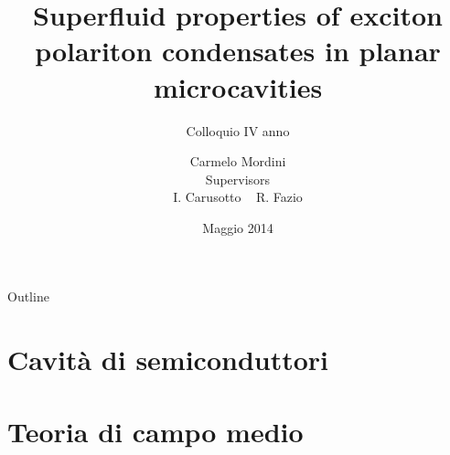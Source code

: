 \documentclass[10pt]{beamer}
\title{Superfluid properties of exciton polariton condensates in planar microcavities}
\subtitle{Colloquio IV anno}
\author[Carmelo Mordini]{Carmelo Mordini\\ \vspace{.7cm}
{\footnotesize Supervisors\\ \vspace{-.1cm}I. Carusotto ~ R. Fazio}}
\institute[SNS]
{
  Scuola Normale Superiore\\
  }
\date{Maggio 2014}
\begin{document}

\begin{frame}[plain]
\advance\textwidth2cm
\hsize\textwidth
\columnwidth\textwidth
  \titlepage
\end{frame}


\begin{frame}{Outline}
  \tableofcontents[pausesections]
\end{frame}

\section{Cavità di semiconduttori}



\section{Teoria di campo medio}
\end{document}
